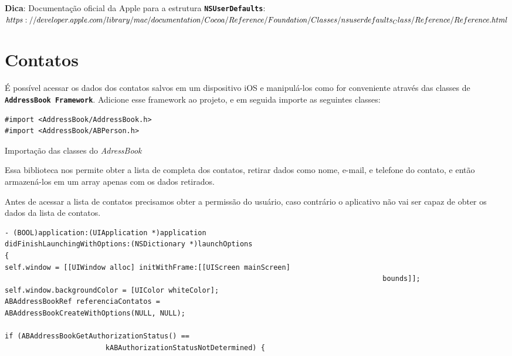 \documentclass[a4paper,12pt,brazil,doubleside]{book}
\begin{document}
\begin{singlespace}
\begin{framed}

\textbf{Dica}: Documentação oficial da Apple para a estrutura \texttt{\textbf{NSUserDefaults}}:\\
\(https://developer.apple.com/library/mac/documentation/Cocoa/Reference\\/Foundation/Classes/nsuserdefaults_Class/Reference/Reference.html
\)
\end{framed}

\section{Contatos}

É possível acessar os dados dos contatos salvos em um dispositivo iOS e manipulá-los como for conveniente através das classes de \texttt{\textbf{AddressBook Framework}}. Adicione esse framework ao projeto, e em seguida importe as seguintes classes:

\begin{listing}[H]
\begin{verbatim}
#import <AddressBook/AddressBook.h>
#import <AddressBook/ABPerson.h>
\end{verbatim}
\caption{Importação das classes do \emph{AdressBook}}
\end{listing}


Essa biblioteca nos permite obter a lista de completa dos contatos, retirar dados como nome, e-mail, e telefone do contato, e então armazená-los em um array apenas com os dados retirados.
 
Antes de acessar a lista de contatos precisamos obter a permissão do usuário, caso contrário o aplicativo não vai ser capaz de obter os dados da lista de contatos.

\begin{listing}[H]
\begin{verbatim}
- (BOOL)application:(UIApplication *)application
didFinishLaunchingWithOptions:(NSDictionary *)launchOptions
{
self.window = [[UIWindow alloc] initWithFrame:[[UIScreen mainScreen] 
                                                                                          bounds]];
self.window.backgroundColor = [UIColor whiteColor];
ABAddressBookRef referenciaContatos = 
ABAddressBookCreateWithOptions(NULL, NULL);
    
if (ABAddressBookGetAuthorizationStatus() == 
						kABAuthorizationStatusNotDetermined) {
						

\end{verbatim}
\end{listing}
\end{singlespace}
\end{document}
